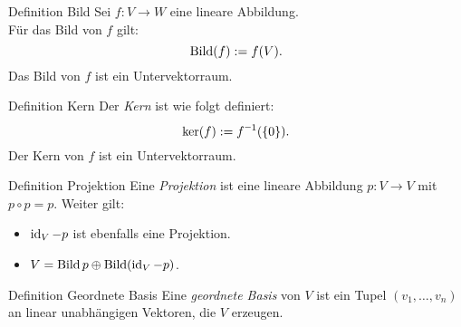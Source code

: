 \documentclass[main.tex]{subfiles}
\begin{document}
\begin{karte}{Definition Bild}
    Sei \( f: V \rightarrow W \) eine lineare Abbildung.\\
    Für das Bild von \(f\) gilt:
    \[ \operatorname{Bild}(f) := f(V). \]
    Das Bild von \(f\) ist ein Untervektorraum.
\end{karte}
\begin{karte}{Definition Kern}
    Der \textit{Kern} ist wie folgt definiert:
    \[ \ker(f) := \inverse{f}(\set{0}). \]
    Der Kern von \(f\) ist ein Untervektorraum.
\end{karte}
\begin{karte}{Definition Projektion}
    Eine \textit{Projektion} ist eine lineare Abbildung \(p: V \rightarrow V\)
    mit \(p \circ p = p\). Weiter gilt: 
    \begin{itemize}
        \item \(\operatorname{id}_V - p\) ist ebenfalls eine Projektion.
        \item \(V = \operatorname{Bild} p \oplus \operatorname{Bild} (\operatorname{id}_V - p) \).
    \end{itemize}     
\end{karte}
\begin{karte}{Definition Geordnete Basis}
    Eine \textit{geordnete Basis} von \(V\) ist ein Tupel \( (v_1,\ldots,v_n) \) 
    an linear unabhängigen Vektoren, die \(V\) erzeugen.
\end{karte}
\end{document}
